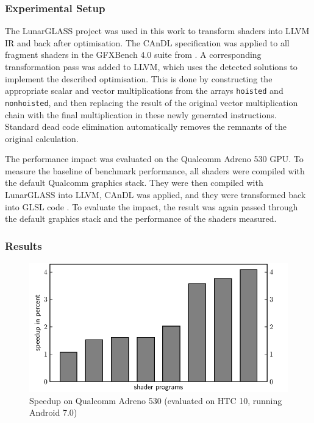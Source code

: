 \subsubsection{Experimental Setup}

    The LunarGLASS project \citep{lunarglass} was used in this work to
    transform shaders into LLVM IR and back after optimisation.
    The CAnDL specification was applied to all fragment shaders in the
    GFXBench 4.0 suite from \citet{gfxbench}.
    A corresponding transformation pass was added to LLVM, which uses the
    detected solutions to implement the described optimisation.
    This is done by constructing the appropriate scalar and vector
    multiplications from the arrays {\tt hoisted} and {\tt nonhoisted}, and then
    replacing the result of the original vector multiplication chain with the
    final multiplication in these newly generated instructions.
    Standard dead code elimination automatically removes the remnants of the
    original calculation.

    The performance impact was evaluated on the Qualcomm Adreno 530 GPU.
    To measure the baseline of benchmark performance, all shaders were
    compiled with the default Qualcomm graphics stack.
    They were then compiled with LunarGLASS into LLVM, CAnDL was applied, and
    they were transformed back into GLSL code \citep{Rost:2009:OSL:1696393}.
    To evaluate the impact, the result was again passed through the default
    graphics stack and the performance of the shaders measured.

\subsubsection{Results}

\begin{figure}[t]
\centering
\includegraphics[width=0.66\linewidth]{figures/qualcomm_plot.pdf}
\caption{Speedup on Qualcomm Adreno 530 (evaluated on HTC 10, running Android 7.0)
         \leftskip=0pt\rightskip=0pt}
\label{fig:qualcommspeedup}
\end{figure}


